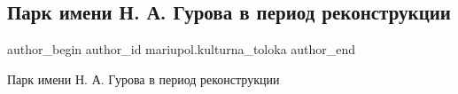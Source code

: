  
 
 
 
 

\subsection{Парк имени Н. А. Гурова в период реконструкции}
\label{sec:15_01_2019.fb.mariupol.kulturna_toloka.1.park_imeni_na_gurova_v_period_rekonstrukcii}

\ifcmt
 author_begin
   author_id mariupol.kulturna_toloka
 author_end
\fi

Парк имени Н. А. Гурова в период реконструкции
